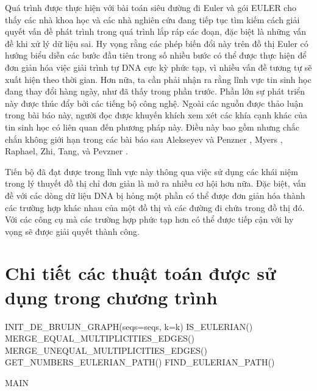 \documentclass[14pt, a4paper]{article}
\numberwithin{equation}{section}
\numberwithin{figure}{section}
\numberwithin{dl}{section}
\numberwithin{md}{section}
\numberwithin{bd}{section}
\numberwithin{dn}{section}
\numberwithin{hq}{section}
\begin{document}
    Quá trình được thực hiện với bài toán siêu đường đi Euler và gói EULER cho thấy các nhà khoa học và các nhà nghiên cứu đang tiếp tục tìm kiếm cách giải quyết vấn đề phát trình trong quá trình lắp ráp các đoạn, đặc biệt là những vấn đề khi xử lý dữ liệu sai.
    Hy vọng rằng các phép biến đổi này trên đồ thị Euler có hướng biểu diễn các bước đầu tiên trong số nhiều bước có thể được thực hiện để đơn giản hóa việc giải trình tự DNA cực kỳ phức tạp, vì nhiều vấn đề tương tự sẽ xuất hiện theo thời gian.
    Hơn nữa, ta cần phải nhận ra rằng lĩnh vực tin sinh học đang thay đổi hàng ngày, như đã thấy trong phần trước.
    Phần lớn sự phát triển này được thúc đẩy bởi các tiếng bộ công nghệ.
    Ngoài các nguồn được thảo luận trong bài báo này, người đọc được khuyến khích xem xét các khía cạnh khác của tin sinh học có liên quan đến phương pháp này.
    Điều này bao gồm nhưng chắc chắn không giới hạn trong các bài báo sau Alekseyev và Penzner \cite{alekseyev2007colored}, Myers \cite{myers2005fragment}, Raphael, Zhi, Tang, và Pevzner \cite{raphael2004novel}. 

    Tiến bộ đã đạt được trong lĩnh vực này thông qua việc sử dụng các khái niệm trong lý thuyết đồ thị chỉ đơn giản là mở ra nhiều cơ hội hơn nữa.
    Đặc biệt, vấn đề với các dòng dữ liệu DNA bị hỏng một phần có thể được đơn giản hóa thành các trường hợp khác nhau của một đồ thị và các đường đi chứa trong đồ thị đó.
    Với các công cụ mà các trường hợp phức tạp hơn có thể được tiếp cận với hy vọng sẽ được giải quyết thành công.

    \newpage
    \printbibliography[title={TÀI LIỆU THAM KHẢO}]

    \newpage

    \appendix

    \section{Chi tiết các thuật toán được sử dụng trong chương trình}


    \begin{algorithm}[h!]
        \DontPrintSemicolon
        INIT\_DE\_BRUIJN\_GRAPH(seqs=seqs, k=k)\;
        IS\_EULERIAN()\;
        MERGE\_EQUAL\_MULTIPLICITIES\_EDGES()\;
        MERGE\_UNEQUAL\_MULTIPLICITIES\_EDGES()\;
         {
            GET\_NUMBERS\_EULERIAN\_PATH()\;
            FIND\_EULERIAN\_PATH()\;
        }
        
        \caption{MAIN}
    \end{algorithm}
\end{document}
